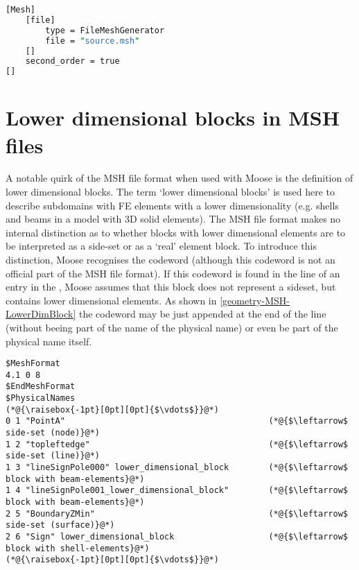 \begin{lstlisting}[language=perl, float, caption={Read mesh from a file},label={geometry-FileMeshGenerator}]
[Mesh]
    [file]
        type = FileMeshGenerator
        file = "source.msh"
    []
    second_order = true
[]
\end{lstlisting}

\section{Lower dimensional blocks in MSH files}
\label{geometry-MSH}

A notable quirk of the MSH file format when used with Moose is the definition
of lower dimensional blocks. The term ‘lower dimensional blocks’ is used here
to describe subdomains with FE elements with a lower dimensionality (e.g.
shells and beams in a model with 3D solid elements). The MSH file format makes
no internal distinction as to whether blocks with lower dimensional elements
are to be interpreted as a side-set or as a ‘real’ element block. To introduce
this distinction, Moose recognises the codeword
 (although this codeword is not an official
part of the MSH file format). If this codeword is found in the line of an entry
in the , Moose assumes that this block does not
represent a sideset, but contains lower dimensional elements. As shown in
\autoref{geometry-MSH-LowerDimBlock} the codeword may be just appended at the
end of the line (without beeing part of the name of the physical name) or even
be part of the physical name itself.

\begin{lstlisting}[float, caption={Fragment of an MSH file containing ‘lower dimensional blocks’},label={geometry-MSH-LowerDimBlock}]
$MeshFormat
4.1 0 8
$EndMeshFormat
$PhysicalNames
(*@{\raisebox{-1pt}[0pt][0pt]{$\vdots$}}@*)
0 1 "PointA"                                         (*@{$\leftarrow$ side-set (node)}@*)
1 2 "topleftedge"                                    (*@{$\leftarrow$ side-set (line)}@*)
1 3 "lineSignPole000" lower_dimensional_block        (*@{$\leftarrow$ block with beam-elements}@*)
1 4 "lineSignPole001_lower_dimensional_block"        (*@{$\leftarrow$ block with beam-elements}@*)
2 5 "BoundaryZMin"                                   (*@{$\leftarrow$ side-set (surface)}@*)
2 6 "Sign" lower_dimensional_block                   (*@{$\leftarrow$ block with shell-elements}@*)
(*@{\raisebox{-1pt}[0pt][0pt]{$\vdots$}}@*)
\end{lstlisting}

